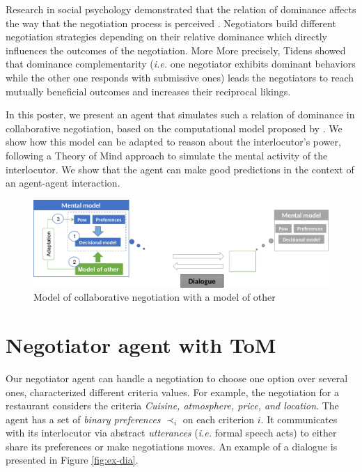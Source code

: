 \documentclass[sigconf]{aamas}  %
\begin{document}
	Research in social psychology demonstrated that the relation of dominance affects the way that the negotiation process is perceived \cite{van2006power}. Negotiators build different negotiation strategies depending on their relative dominance which directly influences the outcomes of the negotiation. More More precisely, Tidens \cite{tiedens2003power} showed that dominance complementarity (\emph{i.e.} one negotiator exhibits dominant behaviors while the other one responds with submissive ones) leads the negotiators to reach mutually beneficial outcomes and increases their reciprocal likings.
	
	In this poster, we present an agent that simulates such a relation of dominance in collaborative negotiation, based on the computational model proposed by \cite{ouali2017computational}. We show how this model can be adapted to reason about the interlocutor's power, following a Theory of Mind approach to simulate the mental activity of the interlocutor. We show that the agent can make good predictions in the context of an agent-agent interaction.
	
	\begin{figure}
		\includegraphics[width=0.7\linewidth]{figs/model_tom.pdf}
		\caption{Model of collaborative negotiation with a model of other} 
		\label{fig:schema-general}
	\end{figure} 
	
	
	\section{Negotiator agent with ToM}
	Our negotiator agent can handle a negotiation to choose one option over several ones, characterized different criteria values. For example, the negotiation for a restaurant considers the criteria \textit{Cuisine, atmosphere, price, and location}. The agent has a set of \textit{binary preferences} $\prec_i$ on each criterion $i$. It communicates with its interlocutor via abstract \emph{utterances} (\emph{i.e.} formal speech acts) to either share its preferences or make negotiations moves. An example of a dialogue is presented in Figure \ref{fig:ex-dia}. 
	
\end{document}
